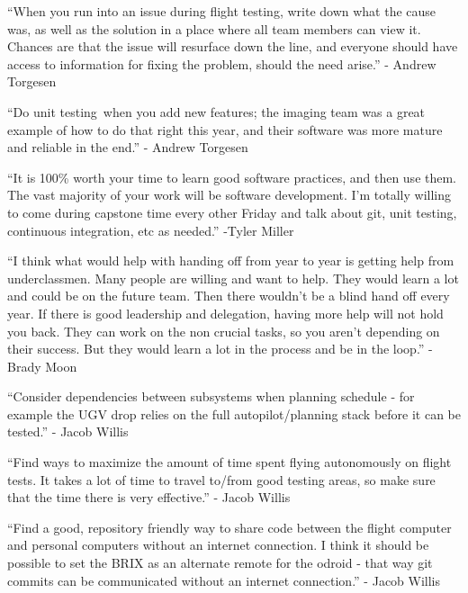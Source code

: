 {``When you run into an issue during flight testing, write down what the
cause was, as well as the solution in a place where all team members can
view it. Chances are that the issue will resurface down the line, and
everyone should have access to information for fixing the problem,
should the need arise.'' - Andrew Torgesen}

{}

{``Do }{unit testing}{~when you add new features; the imaging team was a
great example of how to do that right this year, and their software was
more mature and reliable in the end.'' - Andrew Torgesen}

{}

{``It is 100\% worth your time to learn good software practices, and
then use them. The vast majority of your work will be software
development. I'm totally willing to come during capstone time every
other Friday and talk about git, unit testing, continuous integration,
etc as needed.'' -Tyler Miller}

{}

{``I think what would help with handing off from year to year is getting
help from underclassmen. Many people are willing and want to help. They
would learn a lot and could be on the future team. Then there wouldn't
be a blind hand off every year. If there is good leadership and
delegation, having more help will not hold you back. They can work on
the non crucial tasks, so you aren't depending on their success. But
they would learn a lot in the process and be in the loop.'' -Brady Moon}

{}

{``Consider dependencies between subsystems when planning schedule - for
example the UGV drop relies on the full autopilot/planning stack before
it can be tested.'' - Jacob Willis}

{}

{``Find ways to maximize the amount of time spent flying autonomously on
flight tests. It takes a lot of time to travel to/from good testing
areas, so make sure that the time there is very effective.'' - Jacob
Willis}

{}

{``Find a good, repository friendly way to share code between the flight
computer and personal computers without an internet connection. I think
it should be possible to set the BRIX as an alternate remote for the
odroid - that way git commits can be communicated without an internet
connection.'' - Jacob Willis}

{}

